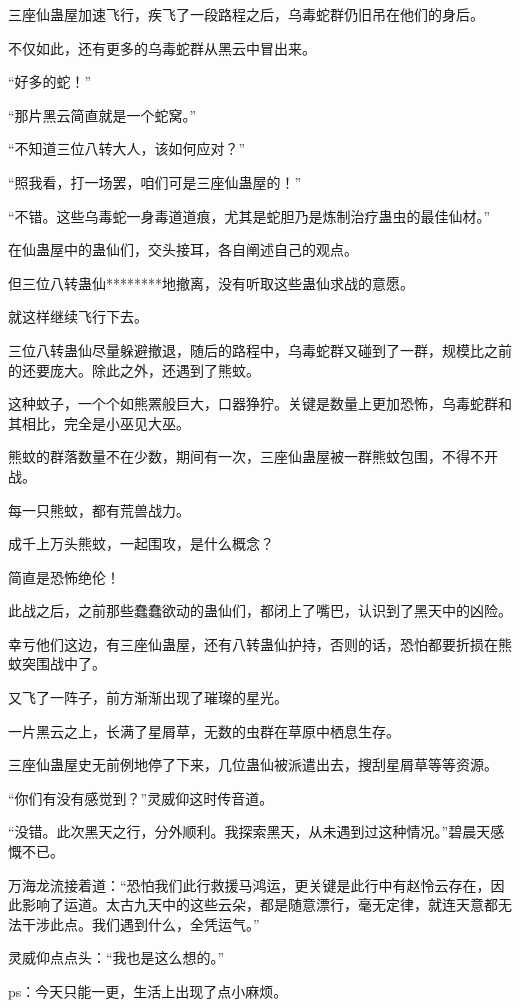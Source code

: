 \begin{this_body}
三座仙蛊屋加速飞行，疾飞了一段路程之后，乌毒蛇群仍旧吊在他们的身后。

不仅如此，还有更多的乌毒蛇群从黑云中冒出来。

“好多的蛇！”

“那片黑云简直就是一个蛇窝。”

“不知道三位八转大人，该如何应对？”

“照我看，打一场罢，咱们可是三座仙蛊屋的！”

“不错。这些乌毒蛇一身毒道道痕，尤其是蛇胆乃是炼制治疗蛊虫的最佳仙材。”

在仙蛊屋中的蛊仙们，交头接耳，各自阐述自己的观点。

但三位八转蛊仙********地撤离，没有听取这些蛊仙求战的意愿。

就这样继续飞行下去。

三位八转蛊仙尽量躲避撤退，随后的路程中，乌毒蛇群又碰到了一群，规模比之前的还要庞大。除此之外，还遇到了熊蚊。

这种蚊子，一个个如熊罴般巨大，口器狰狞。关键是数量上更加恐怖，乌毒蛇群和其相比，完全是小巫见大巫。

熊蚊的群落数量不在少数，期间有一次，三座仙蛊屋被一群熊蚊包围，不得不开战。

每一只熊蚊，都有荒兽战力。

成千上万头熊蚊，一起围攻，是什么概念？

简直是恐怖绝伦！

此战之后，之前那些蠢蠢欲动的蛊仙们，都闭上了嘴巴，认识到了黑天中的凶险。

幸亏他们这边，有三座仙蛊屋，还有八转蛊仙护持，否则的话，恐怕都要折损在熊蚊突围战中了。

又飞了一阵子，前方渐渐出现了璀璨的星光。

一片黑云之上，长满了星屑草，无数的虫群在草原中栖息生存。

三座仙蛊屋史无前例地停了下来，几位蛊仙被派遣出去，搜刮星屑草等等资源。

“你们有没有感觉到？”灵威仰这时传音道。

“没错。此次黑天之行，分外顺利。我探索黑天，从未遇到过这种情况。”碧晨天感慨不已。

万海龙流接着道：“恐怕我们此行救援马鸿运，更关键是此行中有赵怜云存在，因此影响了运道。太古九天中的这些云朵，都是随意漂行，毫无定律，就连天意都无法干涉此点。我们遇到什么，全凭运气。”

灵威仰点点头：“我也是这么想的。”

ps：今天只能一更，生活上出现了点小麻烦。

\end{this_body}


